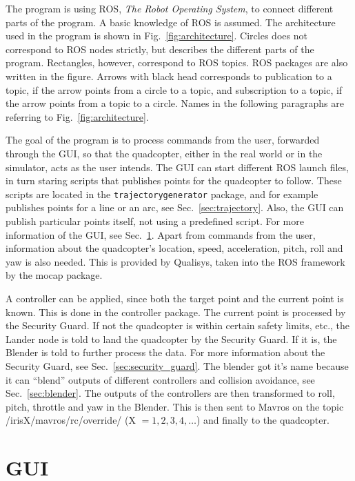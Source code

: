 \documentclass[titlepage,11pt,a4paper]{article}
\begin{document}
The program is using ROS, \textit{The Robot Operating System}, to
connect different parts of the program. A basic knowledge of ROS is
assumed. The architecture used in the program is shown in
Fig.~\ref{fig:architecture}. Circles does not correspond to ROS nodes
strictly, but describes the different parts of the
program. Rectangles, however, correspond to ROS topics. ROS packages
are also written in the figure. Arrows with black head corresponds to
publication to a topic, if the arrow points from a circle to a topic,
and subscription to a topic, if the arrow points from a topic to a
circle. Names in the following paragraphs are referring to
Fig.~\ref{fig:architecture}.

The goal of the program is to process commands from the user,
forwarded through the GUI, so that the quadcopter, either in the real
world or in the simulator, acts as the user intends. The GUI can start
different ROS launch files, in turn staring scripts that publishes
points for the quadcopter to follow. These scripts are located in the
\texttt{trajectory\textunderscore generator} package, and for example publishes
points for a line or an arc, see Sec.~\ref{sec:trajectory}. Also, the GUI can publish particular
points itself, not using a predefined script. For more information of
the GUI, see Sec.~\ref{sec:gui}. Apart from commands from the user,
information about the quadcopter's location, speed, acceleration,
pitch, roll and yaw is also needed. This is provided by Qualisys,
taken into the ROS framework by the mocap package.

A controller can be applied, since both the target point and the
current point is known. This is done in the controller package. The
current point is processed by the Security Guard. If not the
quadcopter is within certain safety limits, etc., the Lander node is
told to land the quadcopter by the Security Guard. If it is, the
Blender is told to further process the data. For more information about the Security Guard, see Sec.~\ref{sec:security_guard}. The blender got it's name
because it can ``blend'' outputs of different controllers and
collision avoidance, see Sec.~\ref{sec:blender}. The outputs of the controllers are then
transformed to roll, pitch, throttle and yaw in the Blender. This is
then sent to Mavros on the topic /irisX/mavros/rc/override/ (X $= 1,
2, 3, 4, \dots$) and finally to the quadcopter.


\section{GUI}
\label{sec:gui}
\end{document}
